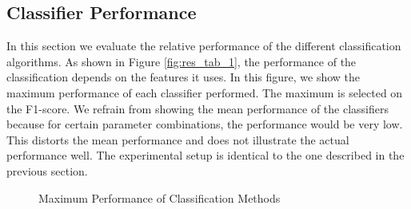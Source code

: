 

\subsection{Classifier Performance}
In this section we evaluate the relative performance of the different classification algorithms. As shown in Figure \ref{fig:res_tab_1}, the performance of the classification depends on the features it uses. In this figure, we show the maximum performance of each classifier performed. The maximum is selected on the F1-score. We refrain from showing the mean performance of the classifiers because for certain parameter combinations, the performance would be very low. This distorts the mean performance and does not illustrate the actual performance well. The experimental setup is identical to the one described in the previous section.

\dataone

\begin{figure}
	\caption{Maximum Performance of Classification Methods}
	\label{fig:res_bar_1}
\end{figure}

